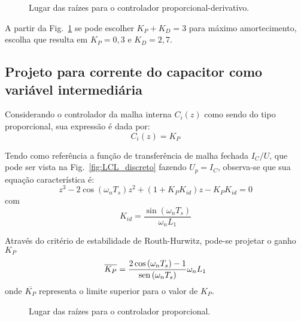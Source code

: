     \begin{figure}[htb]
        \renewcommand\figurename{Fig.}
        \caption{Lugar das raízes para o controlador proporcional-derivativo.}
        \label{fig:rlocus_vc_2}
    \end{figure}

    A partir da Fig.~\ref{fig:rlocus_vc_2} se pode escolher $K_P+K_D = 3$ para máximo amortecimento, escolha que resulta em $K_P = 0,3$ e $K_D = 2,7$.


\subsection{Projeto para corrente do capacitor como variável intermediária}

    Considerando o controlador da malha interna $C_i(z)$ como sendo do tipo proporcional, sua expressão é dada por:
    \begin{equation}
        C_i(z) = K_P
    \end{equation}

    Tendo como referência a função de transferência de malha fechada $I_C/U$, que pode ser vista na Fig.~\ref{fig:LCL_discreto} fazendo $U_p = I_C$, observa-se que sua equação característica é:
    \begin{equation}
        z^3 - 2 \cos \left( \omega_n T_s \right) z^2 + \left( 1 + K_P K_{id} \right) z - K_P K_{id} = 0
    \end{equation}
    com
    \begin{equation}
        K_{id} = \frac{\sin(\omega_n T_s)}{\omega_n L_1}
    \end{equation}

    Através do critério de estabilidade de Routh-Hurwitz, pode-se projetar o ganho $K_P$
    \begin{equation}
        \overline{K_P} = \frac{2 \cos \left( \omega_n T_s \right) - 1}
            {\operatorname{sen} \left( \omega_n T_s \right)} \omega_n L_1
    \end{equation}
    onde $\overline{K_P}$ representa o limite superior para o valor de $K_P$.

    \begin{figure}[htb]
        \centering{
            \def\svgwidth{\textwidth}
            }
        \renewcommand\figurename{Fig.}
        \caption{Lugar das raízes para o controlador proporcional.}
        \label{fig:rlocus_ic_2}
    \end{figure}

